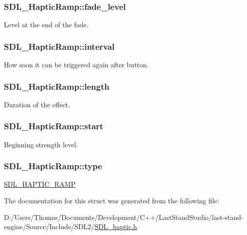 \subsubsection[{fade\+\_\+level}]{ S\+D\+L\+\_\+\+Haptic\+Ramp\+::fade\+\_\+level}\label{structSDL__HapticRamp_a66b586f2e6a23a085a7b2854f61752c5}
Level at the end of the fade. \hypertarget{structSDL__HapticRamp_a4b89d108cfa7e96ea58b58771334c33d}{}
\subsubsection[{interval}]{ S\+D\+L\+\_\+\+Haptic\+Ramp\+::interval}\label{structSDL__HapticRamp_a4b89d108cfa7e96ea58b58771334c33d}
How soon it can be triggered again after button. \hypertarget{structSDL__HapticRamp_a57e75237507701405af2a3caf34cdb5a}{}
\subsubsection[{length}]{ S\+D\+L\+\_\+\+Haptic\+Ramp\+::length}\label{structSDL__HapticRamp_a57e75237507701405af2a3caf34cdb5a}
Duration of the effect. \hypertarget{structSDL__HapticRamp_acc0e813ac6399290fd4a788d2471e8d4}{}
\subsubsection[{start}]{ S\+D\+L\+\_\+\+Haptic\+Ramp\+::start}\label{structSDL__HapticRamp_acc0e813ac6399290fd4a788d2471e8d4}
Beginning strength level. \hypertarget{structSDL__HapticRamp_aca1c2349372433822ab62f60976640aa}{}
\subsubsection[{type}]{ S\+D\+L\+\_\+\+Haptic\+Ramp\+::type}\label{structSDL__HapticRamp_aca1c2349372433822ab62f60976640aa}
\hyperlink{SDL__haptic_8h_af10eb937a64a8f602e9c46682ac0d868}{S\+D\+L\+\_\+\+H\+A\+P\+T\+I\+C\+\_\+\+R\+A\+M\+P} 

The documentation for this struct was generated from the following file\+:\begin{DoxyCompactItemize}
\item 
D\+:/\+Users/\+Thomas/\+Documents/\+Development/\+C++/\+Last\+Stand\+Studio/last-\/stand-\/engine/\+Source/\+Include/\+S\+D\+L2/\hyperlink{SDL__haptic_8h}{S\+D\+L\+\_\+haptic.\+h}\end{DoxyCompactItemize}
